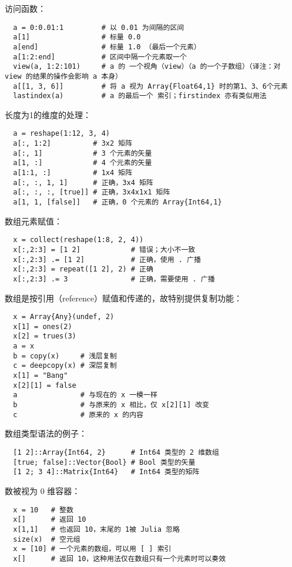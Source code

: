 \documentclass[10pt,a4paper]{article}
\begin{document}
访问函数：
\begin{lstlisting}
  a = 0:0.01:1         # 以 0.01 为间隔的区间
  a[1]                 # 标量 0.0
  a[end]               # 标量 1.0 （最后一个元素）
  a[1:2:end]           # 区间中隔一个元素取一个
  view(a, 1:2:101)     # a 的 一个视角（view）（a 的一个子数组）（译注：对 view 的结果的操作会影响 a 本身）
  a[[1, 3, 6]]         # 将 a 视为 Array{Float64,1} 时的第1、3、6个元素
  lastindex(a)         # a 的最后一个 索引；firstindex 亦有类似用法 
\end{lstlisting}

长度为1的维度的处理：
\begin{lstlisting}
  a = reshape(1:12, 3, 4)
  a[:, 1:2]          # 3x2 矩阵
  a[:, 1]            # 3 个元素的矢量
  a[1, :]            # 4 个元素的矢量
  a[1:1, :]          # 1x4 矩阵
  a[:, :, 1, 1]      # 正确，3x4 矩阵
  a[:, :, :, [true]] # 正确，3x4x1x1 矩阵
  a[1, 1, [false]]   # 正确，0 个元素的 Array{Int64,1}
\end{lstlisting}

数组元素赋值：
\begin{lstlisting}
  x = collect(reshape(1:8, 2, 4))
  x[:,2:3] = [1 2]            # 错误；大小不一致
  x[:,2:3] .= [1 2]           # 正确，使用 . 广播
  x[:,2:3] = repeat([1 2], 2) # 正确
  x[:,2:3] .= 3               # 正确，需要使用 . 广播
\end{lstlisting}

数组是按引用（reference）赋值和传递的，故特别提供复制功能：
\begin{lstlisting}
  x = Array{Any}(undef, 2)
  x[1] = ones(2)
  x[2] = trues(3)
  a = x
  b = copy(x)     # 浅层复制
  c = deepcopy(x) # 深层复制
  x[1] = "Bang"
  x[2][1] = false
  a               # 与现在的 x 一模一样
  b               # 与原来的 x 相比，仅 x[2][1] 改变
  c               # 原来的 x 的内容
\end{lstlisting}

数组类型语法的例子：
\begin{lstlisting}
  [1 2]::Array{Int64, 2}      # Int64 类型的 2 维数组
  [true; false]::Vector{Bool} # Bool 类型的矢量
  [1 2; 3 4]::Matrix{Int64}   # Int64 类型的矩阵
\end{lstlisting}

数被视为 0 维容器：
\begin{lstlisting}
  x = 10   # 整数
  x[]      # 返回 10
  x[1,1]   # 也返回 10，末尾的 1被 Julia 忽略
  size(x)  # 空元组
  x = [10] # 一个元素的数组，可以用 [ ] 索引
  x[]      # 返回 10，这种用法仅在数组只有一个元素时可以奏效
\end{lstlisting}
\end{document}
